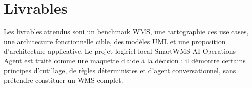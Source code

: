 \section{Livrables}
Les livrables attendus sont un benchmark WMS, une cartographie des use cases, une architecture fonctionnelle cible, des modèles UML et une proposition d'architecture applicative. Le projet logiciel local SmartWMS AI Operations Agent est traité comme une maquette d'aide à la décision : il démontre certains principes d'outillage, de règles déterministes et d'agent conversationnel, sans prétendre constituer un WMS complet.
